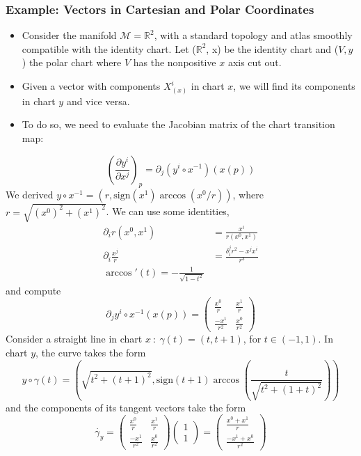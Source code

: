 \documentclass[10pt]{article}
\begin{document}
\subsubsection*{Example: Vectors in Cartesian and Polar Coordinates}
\begin{itemize}
    \item Consider the manifold $\mathcal{M} = \mathbb{R}^2$, with a standard topology and atlas smoothly compatible with the identity chart.  Let ($\mathbb{R}^2$, x) be the identity chart and ($V, y$) the polar chart where $V$ has the nonpositive $x$ axis cut out.
    \item Given a vector with components $X_{(x)}^i$ in chart $x$, we will find its components in chart $y$ and vice versa.
    \item To do so, we need to evaluate the Jacobian matrix of the chart transition map:
\end{itemize}
\[\left(\frac{\partial y^i}{\partial x^j}\right)_p = \partial_j (y^i \circ x^{-1})(x(p))\]
We derived $y \circ x^{-1} = (r, \text{sign}(x^1) \arccos(x^0 / r))$, where $r = \sqrt{(x^0)^2 + (x^1)^2}$.  We can use some identities,
\begin{align*}
    \partial_i r(x^0, x^1) &= \frac{x^i}{r(x^0, x^1)}\\
    \partial_i \frac{x^j}{r} &= \frac{\delta_i^j r^2 - x^j x^i}{r^3}\\
    \arccos'(t) = -\frac{1}{\sqrt{1 - t^2}}
\end{align*}
and compute
\[\partial_j y^i \circ x^{-1}(x(p)) = \begin{pmatrix} \frac{x^0}{r} & \frac{x^1}{r} \\ \frac{-x^1}{r^2} & \frac{x^0}{r^2} \end{pmatrix}\]
Consider a straight line in chart $x \::\: \gamma(t) = (t, t + 1)$, for $t \in (-1, 1)$.  In chart $y$, the curve takes the form
\[y \circ \gamma(t) = \left(\sqrt{t^2 + (t + 1)^2}, \text{sign}(t + 1) \arccos \left(\frac{t}{\sqrt{t^2 + (1 + t)^2}}\right)\right)\]
and the components of its tangent vectors take the form
\[\dot{\gamma_y} = \begin{pmatrix} \frac{x^0}{r} & \frac{x^1}{r} \\ \frac{-x^1}{r^2} & \frac{x^0}{r^2} \end{pmatrix} \begin{pmatrix} 1 \\ 1 \end{pmatrix} = \begin{pmatrix} \frac{x^0 + x^1}{r} \\ \frac{-x^1 + x^0}{r^2} \end{pmatrix}\]
\end{document}
